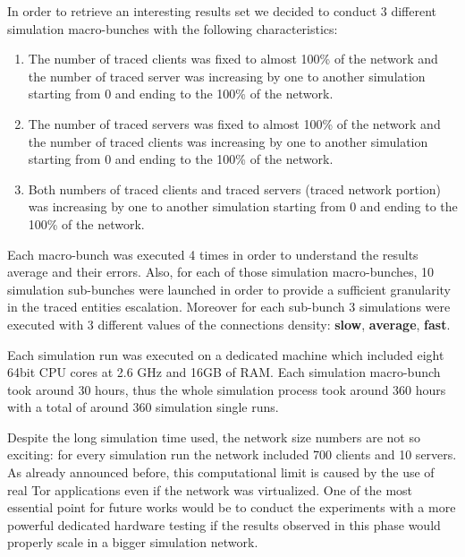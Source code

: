 In order to retrieve an interesting results set we decided to conduct
3 different simulation macro-bunches with the following characteristics:
\begin{enumerate}
	\item The number of traced clients was fixed to almost 100\% of the                           %
network and the number of traced server was increasing by one to another
simulation starting from 0 and ending to the 100\% of the network.
	\item The number of traced servers was fixed to almost 100\% of the
network and the number of traced clients was increasing by one to another
simulation starting from 0 and ending to the 100\% of the network.
	\item Both numbers of traced clients and traced servers (traced
network portion) was increasing by one to another
simulation starting from 0 and ending to the 100\% of the network.
\end{enumerate}

Each macro-bunch was executed 4 times in order to understand the results
average and their errors. 
Also, for each of those simulation macro-bunches, 10 simulation sub-bunches were
launched in order to provide a sufficient granularity in the traced
entities escalation. Moreover for each sub-bunch 3 simulations were
executed with 3 different values of the connections density: \textbf{slow},
\textbf{average}, \textbf{fast}. 

Each simulation run was executed on a dedicated machine which included                          %
 eight 64bit CPU cores at 2.6 GHz and 16GB of RAM. Each simulation
macro-bunch took around 30 hours, thus the whole simulation process took
around 360 hours with a total of around 360 simulation single runs.

Despite the long simulation time used, the network size numbers are not
so exciting: for every simulation run the network included 700 clients
and 10 servers. As already announced before, this computational limit is
caused by the use of real Tor applications even if the network was
virtualized. One of the most essential point for future works would be to                       %
conduct the experiments with a more powerful dedicated hardware testing
if the results observed in this phase would properly scale in a bigger
simulation network. 

